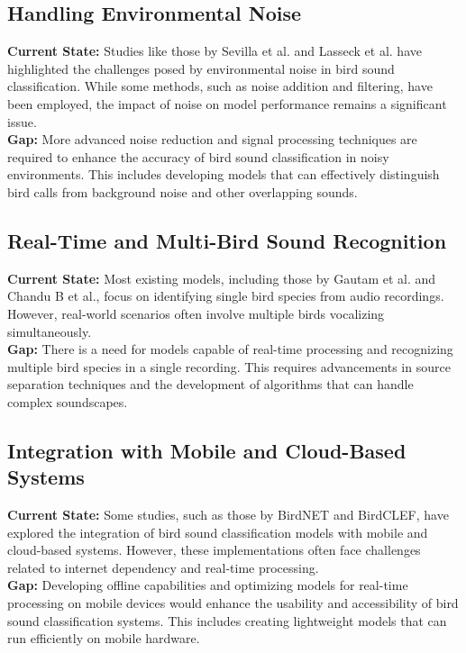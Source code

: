 \subsection{Handling Environmental Noise}
\textbf{Current State:} Studies like those by Sevilla et al.\cite{sevilla2017audio} and Lasseck et al.\cite{lasseck2018acoustic} have highlighted the challenges posed by environmental noise in bird sound classification. While some methods, such as noise addition and filtering, have been employed, the impact of noise on model performance remains a significant issue.\\
\textbf{Gap:} More advanced noise reduction and signal processing techniques are required to enhance the accuracy of bird sound classification in noisy environments. This includes developing models that can effectively distinguish bird calls from background noise and other overlapping sounds.

\subsection{Real-Time and Multi-Bird Sound Recognition}
\textbf{Current State:} Most existing models, including those by Gautam et al.\cite{gautam2023audio} and Chandu B et al.\cite{chandu2020automated}, focus on identifying single bird species from audio recordings. However, real-world scenarios often involve multiple birds vocalizing simultaneously.\\
\textbf{Gap:} There is a need for models capable of real-time processing and recognizing multiple bird species in a single recording. This requires advancements in source separation techniques and the development of algorithms that can handle complex soundscapes.

\subsection{Integration with Mobile and Cloud-Based Systems}
\textbf{Current State:} Some studies, such as those by BirdNET and BirdCLEF, have explored the integration of bird sound classification models with mobile and cloud-based systems. However, these implementations often face challenges related to internet dependency and real-time processing.\\
\textbf{Gap:} Developing offline capabilities and optimizing models for real-time processing on mobile devices would enhance the usability and accessibility of bird sound classification systems. This includes creating lightweight models that can run efficiently on mobile hardware.

